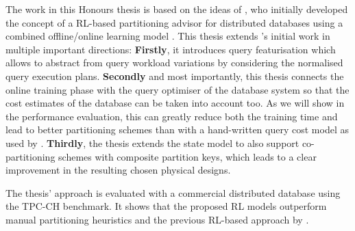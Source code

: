 The work in this Honours thesis is based on the ideas of \citeauthor{Hilprecht:2019:TLP:3329859.3329876}, who initially developed the concept of a RL-based partitioning advisor for distributed databases
using a combined offline/online learning model \cite{Hilprecht:2019:TLP:3329859.3329876,DBLP:conf/sigmod/HilprechtBR20}. This thesis extends \citeauthor{Hilprecht:2019:TLP:3329859.3329876}'s initial work in multiple important directions: \textbf{Firstly}, it introduces query featurisation which allows to abstract from query workload variations by considering the normalised query execution plans. \textbf{Secondly} and most importantly, this thesis connects the online training phase with
the query optimiser of the database system so that the cost estimates of the database can be taken into account too. As we will show in the performance evaluation, this can greatly reduce both the training time and lead to better partitioning schemes than with a hand-written query cost model as used by \citeauthor{Hilprecht:2019:TLP:3329859.3329876}. \textbf{Thirdly}, the thesis extends the state model to also support co-partitioning schemes with composite partition keys, which leads to a clear improvement in the resulting chosen physical designs. 

The thesis' approach is evaluated with a commercial distributed database using the TPC-CH benchmark. It shows that the proposed RL models outperform manual partitioning heuristics and the previous RL-based approach by \citeauthor{Hilprecht:2019:TLP:3329859.3329876}.



